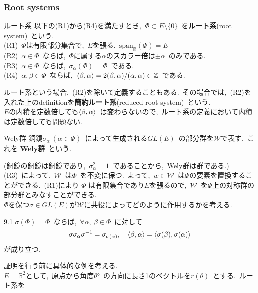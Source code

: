 \documentclass[uplatex,dvipdfmx]{jsarticle}
\begin{document}
\subsubsection{Root systems}
\begin{mydef}{ルート系}
    以下の(R1)から(R4)を満たすとき,~$\Phi \subset E\setminus \{0\}$~を\textbf{ルート系}(root system)~という.\\
    (R1)~$\Phi$は有限部分集合で,~$E$を張る.~$\text{span}_\mathbb{R}(\Phi) = E$\\
    (R2)~$\alpha \in \Phi$~ならば,~$\Phi$に属する$\alpha$のスカラー倍は$\pm \alpha$~のみである.\\
    (R3)~$\alpha \in \Phi$~ならば,~$\sigma_\alpha(\Phi) = \Phi$~である.\\
    (R4)~$\alpha,\beta \in \Phi$~ならば,~$\ev{\beta ,\alpha} = 2(\beta, \alpha)/(\alpha, \alpha) \in \mathbb{Z}$~である.
\end{mydef}
ルート系という場合,~(R2)を除いて定義することもある.~その場合では,~(R2)を入れた上のdefinitionを\textbf{簡約ルート系}(reduced root system)~という.\\
$E$の内積を定数倍しても$\ev{\beta,\alpha}$~は変わらないので,~ルート系の定義において内積は定数倍しても問題ない.\\
\begin{mydef}{Wely群}
    銅鏡$\sigma_\alpha~(\alpha \in \Phi)$~によって生成される$GL(E)$~の部分群を$\mathcal{W}$で表す.~これを \textbf{Wely群}~という.
\end{mydef}
(銅鏡の銅鏡は銅鏡であり,~$\sigma_\alpha^2 = 1$~であることから,~Wely群は群である.)\\
(R3)~によって,~$\mathcal{W}$~は$\Phi$~を不変に保つ.~よって,~$w \in \mathcal{W}$~は$\Phi$の要素を置換することができる.~(R1)により $\Phi$ は有限集合であり$E$を張るので,~$\mathcal{W}$~を$\Phi$上の対称群の部分群とみなすことができる.\\
$\Phi$を保つ$\sigma \in GL(E)$が$\mathcal{W}$に共役によってどのように作用するかを考える.
\begin{mylemma}{9.1}
    $\sigma (\Phi) = \Phi$~ならば,~$\forall \alpha,~\beta \in \Phi$~に対して
    \begin{equation*}
        \sigma \sigma_\alpha \sigma^{-1} = \sigma_{\sigma(\alpha)}, \quad \ev{\beta, \alpha} = \ev{\sigma(\beta), \sigma(\alpha)}
    \end{equation*}
    が成り立つ.
\end{mylemma}
証明を行う前に具体的な例を考える.\\
$E = \mathbb{R}^2$として,~原点から角度$\theta$°~の方向に長さ1のベクトルを$r(\theta)$~とする.~ルート系を
\end{document}
